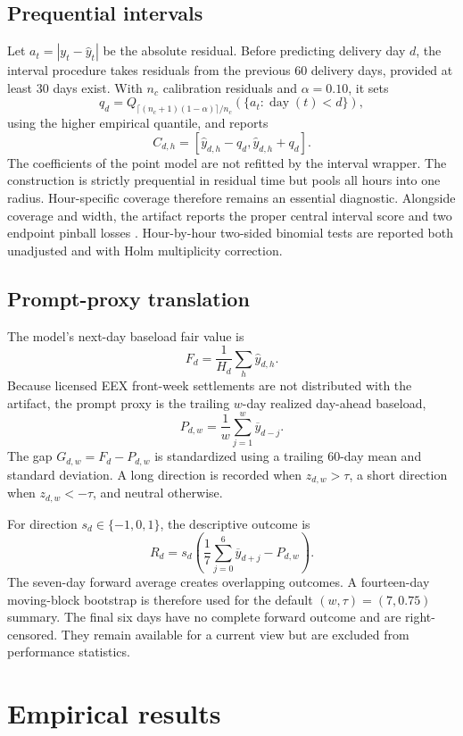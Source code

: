 \documentclass[11pt]{article}
\begin{document}
\subsection{Prequential intervals}

Let $a_t=|y_t-\widehat y_t|$ be the absolute residual.  Before predicting
delivery day $d$, the interval procedure takes residuals from the previous
60 delivery days, provided at least 30 days exist.  With $n_c$ calibration
residuals and $\alpha=0.10$, it sets
\[
  q_d = Q_{\lceil(n_c+1)(1-\alpha)\rceil/n_c}
        \left(\{a_t:\operatorname{day}(t)<d\}\right),
\]
using the higher empirical quantile, and reports
\[
  C_{d,h}=[\widehat y_{d,h}-q_d,\widehat y_{d,h}+q_d].
\]
The coefficients of the point model are not refitted by the interval wrapper.
The construction is strictly prequential in residual time but pools all hours
into one radius.  Hour-specific coverage therefore remains an essential
diagnostic. Alongside coverage and width, the artifact reports the proper
central interval score and two endpoint pinball losses \cite{gneiting2007}.
Hour-by-hour two-sided binomial tests are reported both unadjusted and with
Holm multiplicity correction.

\subsection{Prompt-proxy translation}

The model's next-day baseload fair value is
\[
  F_d=\frac{1}{H_d}\sum_h\widehat y_{d,h}.
\]
Because licensed EEX front-week settlements are not distributed with the
artifact, the prompt proxy is the trailing $w$-day realized day-ahead
baseload,
\[
  P_{d,w}=\frac{1}{w}\sum_{j=1}^{w}\overline y_{d-j}.
\]
The gap $G_{d,w}=F_d-P_{d,w}$ is standardized using a trailing 60-day mean and
standard deviation.  A long direction is recorded when $z_{d,w}>\tau$, a
short direction when $z_{d,w}<-\tau$, and neutral otherwise.

For direction $s_d\in\{-1,0,1\}$, the descriptive outcome is
\[
  R_d=s_d\left(
  \frac{1}{7}\sum_{j=0}^{6}\overline y_{d+j}-P_{d,w}
  \right).
\]
The seven-day forward average creates overlapping outcomes.  A fourteen-day
moving-block bootstrap \cite{kunsch1989} is therefore used for the default
$(w,\tau)=(7,0.75)$
summary.  The final six days have no complete forward outcome and are
right-censored.  They remain available for a current view but are excluded
from performance statistics.

\section{Empirical results}
\end{document}
